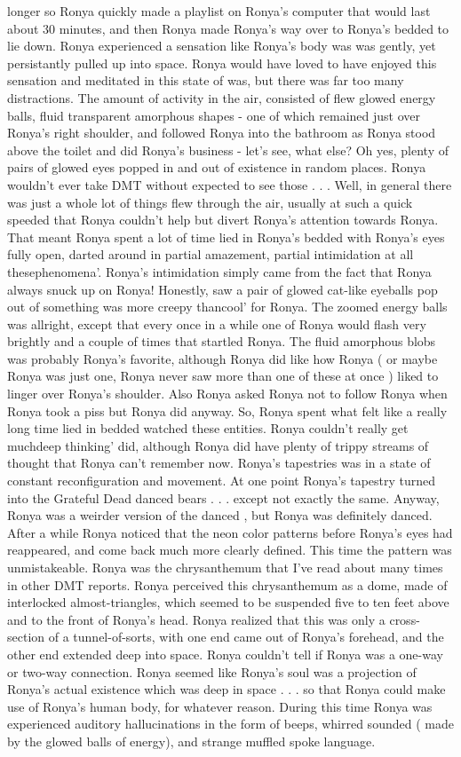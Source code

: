 \documentclass[12pt]{book}
\begin{document}
longer so Ronya quickly made a playlist on Ronya's computer that would last about 30 minutes, and then Ronya made Ronya's way over to Ronya's bedded to lie down. Ronya experienced a sensation like Ronya's body was was gently, yet persistantly pulled up into space. Ronya would have loved to have enjoyed this sensation and meditated in this state of was, but there was far too many distractions. The amount of activity in the air, consisted of flew glowed energy balls, fluid transparent amorphous shapes - one of which remained just over Ronya's right shoulder, and followed Ronya into the bathroom as Ronya stood above the toilet and did Ronya's business - let's see, what else? Oh yes, plenty of pairs of glowed eyes popped in and out of existence in random places. Ronya wouldn't ever take DMT without expected to see those . . .  Well, in general there was just a whole lot of things flew through the air, usually at such a quick speeded that Ronya couldn't help but divert Ronya's attention towards Ronya. That meant Ronya spent a lot of time lied in Ronya's bedded with Ronya's eyes fully open, darted around in partial amazement, partial intimidation at all thesephenomena'. Ronya's intimidation simply came from the fact that Ronya always snuck up on Ronya! Honestly, saw a pair of glowed cat-like eyeballs pop out of something was more creepy thancool' for Ronya. The zoomed energy balls was allright, except that every once in a while one of Ronya would flash very brightly and a couple of times that startled Ronya. The fluid amorphous blobs was probably Ronya's favorite, although Ronya did like how Ronya ( or maybe Ronya was just one, Ronya never saw more than one of these at once ) liked to linger over Ronya's shoulder. Also Ronya asked Ronya not to follow Ronya when Ronya took a piss but Ronya did anyway. So, Ronya spent what felt like a really long time lied in bedded watched these entities. Ronya couldn't really get muchdeep thinking' did, although Ronya did have plenty of trippy streams of thought that Ronya can't remember now. Ronya's tapestries was in a state of constant reconfiguration and movement. At one point Ronya's tapestry turned into the Grateful Dead danced bears . . .  except not exactly the same. Anyway, Ronya was a weirder version of the danced , but Ronya was definitely danced. After a while Ronya noticed that the neon color patterns before Ronya's eyes had reappeared, and come back much more clearly defined. This time the pattern was unmistakeable. Ronya was the chrysanthemum that I've read about many times in other DMT reports. Ronya perceived this chrysanthemum as a dome, made of interlocked almost-triangles, which seemed to be suspended five to ten feet above and to the front of Ronya's head. Ronya realized that this was only a cross-section of a tunnel-of-sorts, with one end came out of Ronya's forehead, and the other end extended deep into space. Ronya couldn't tell if Ronya was a one-way or two-way connection. Ronya seemed like Ronya's soul was a projection of Ronya's actual existence which was deep in space . . .  so that Ronya could make use of Ronya's human body, for whatever reason. During this time Ronya was experienced auditory hallucinations in the form of beeps, whirred sounded ( made by the glowed balls of energy), and strange muffled spoke language. 
\end{document}
